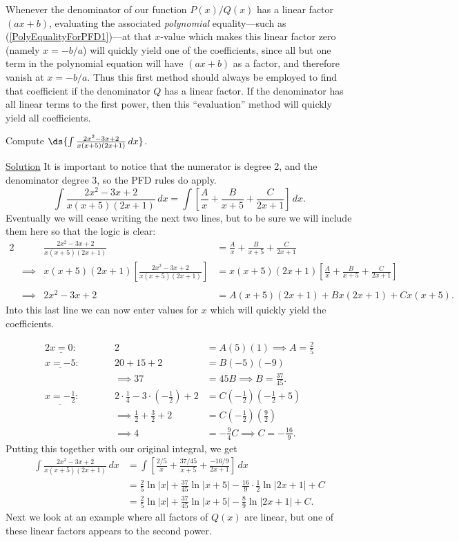 Whenever the denominator of our function $P(x)/Q(x)$ has
a linear factor $(ax+b)$, evaluating the associated {\it polynomial}
equality---such as (\ref{PolyEqualityForPFD1})---at that
$x$-value which makes this linear factor zero (namely 
$x=-b/a$) will
quickly yield one of the coefficients, since all but one
term in the polynomial equation will have $(ax+b)$ as a factor,
and therefore vanish at $x=-b/a$.
Thus this first method should always be employed to find that
coefficient if the
denominator $Q$ has a linear factor.  If the denominator 
has all linear terms to the first power, then this ``evaluation''
method will quickly yield all coefficients.

\bex Compute $\ds{\int\frac{2x^2-3x+2}{x(x+5)(2x+1)}\,dx}$.

\underline{Solution} It is important to notice that the numerator
is degree 2, and the denominator degree 3, so the PFD rules do apply.
$$\int\frac{2x^2-3x+2}{x(x+5)(2x+1)}\,dx
 =\int\left[\frac{A}x+\frac{B}{x+5}+\frac{C}{2x+1}\right]\,dx.$$
Eventually we will cease writing the next two lines, but to be
sure we will include them here so that the logic is clear:
\begin{alignat*}{2}
&&\frac{2x^2-3x+2}{x(x+5)(2x+1)}&=\frac{A}x+\frac{B}{x+5}+\frac{C}{2x+1}
   \\
&\implies
  &x(x+5)(2x+1)\left[\frac{2x^2-3x+2}{x(x+5)(2x+1)}\right]
    &=x(x+5)(2x+1)\left[\frac{A}x+\frac{B}{x+5}+\frac{C}{2x+1}\right]\\ \\
&\implies&2x^2-3x+2&=A(x+5)(2x+1)+Bx(2x+1)+Cx(x+5).
\end{alignat*}
Into this last line we can now enter values for $x$ which will
quickly yield the coefficients.

\begin{alignat*}{2}
\underline{x=0}:\qquad&& 2&=A(5)(1)\implies\boxed{A=\frac25}\\
\underline{x=-5}:\qquad&& 20+15+2&=B(-5)(-9)\\
              &&\implies 37&=45B\implies\boxed{B=\frac{37}{45}}.\\
\underline{x=-\frac12}:\qquad&&
              2\cdot\frac14-3\cdot\left(-\frac12\right)+2
                &=C\left(-\frac12\right)\left(-\frac12+5\right)\\
              &&\implies \frac12+\frac32+2&=C\left(-\frac12\right)
                    \left(\frac92\right)\\
              &&\implies4&=-\frac94C\implies
                       \boxed{C=-\frac{16}9}.
              \end{alignat*}
Putting this together with our original integral, we get
\begin{align*}
\int\frac{2x^2-3x+2}{x(x+5)(2x+1)}\,dx
&=\int\left[\frac{2/5}x+\frac{37/45}{x+5}+\frac{-16/9}{2x+1}\right]\,dx\\
&=\frac25\ln|x|+\frac{37}{45}\ln|x+5|-\frac{16}9\cdot\frac12\ln|2x+1|+C\\
&=\frac25\ln|x|+\frac{37}{45}\ln|x+5|-\frac89\ln|2x+1|+C.
\end{align*}
\eex
Next we look at an example where all factors of $Q(x)$ are linear, 
but one of these linear factors appears to the second power.

